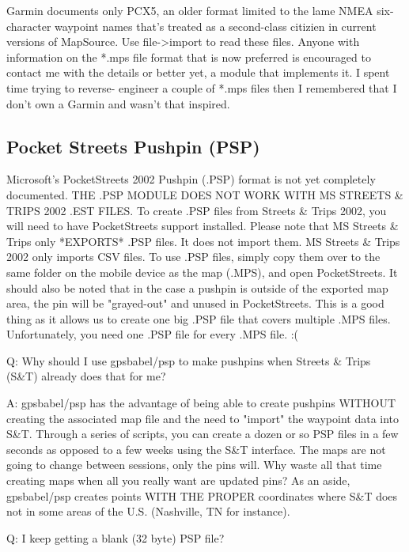 \documentclass[12pt]{article}
\begin{document}
	Garmin documents only PCX5, an older format limited to the lame NMEA
	six-character waypoint names that's treated as a second-class citizien
	in current versions of MapSource.  Use file->import to read these 
	files.   Anyone with information on the *.mps file format that is
	now preferred is encouraged to contact me with the details or better
	yet, a module that implements it.   I spent time trying to reverse-
	engineer a couple of *.mps files then I remembered that I don't own
	a Garmin and wasn't that inspired.



\subsection{Pocket Streets Pushpin (PSP)}

	Microsoft's PocketStreets 2002 Pushpin (.PSP) format is not yet 
	completely documented.  THE .PSP MODULE DOES NOT WORK WITH MS 
	STREETS \& TRIPS 2002 .EST FILES.  To create .PSP files from 
        Streets \& Trips 2002, you will need to have PocketStreets support 
	installed.  Please note that MS Streets \& Trips only *EXPORTS* 
	.PSP files. It does not import them.  MS Streets \& Trips 2002 
	only imports CSV files.  To use .PSP files, simply copy them 
	over to the same folder on the mobile device as the map (.MPS), 
	and open PocketStreets.  It should also be noted that in the case 
	a pushpin is outside of the exported map area, the pin will be 
	"grayed-out" and unused in PocketStreets.  This is a good thing 
	as it allows us to create one big .PSP file that covers multiple 
	.MPS files.  Unfortunately, you need one .PSP file for every 
	.MPS file. :(

Q: Why should I use gpsbabel/psp to make pushpins when Streets \& Trips (S\&T)
   already does that for me?

A: gpsbabel/psp has the advantage of being able to create pushpins WITHOUT
   creating the associated map file and the need to "import" the waypoint
   data into S\&T.  Through a series of scripts, you can create a dozen
   or so PSP files in a few seconds as opposed to a few weeks using the
   S\&T interface.  The maps are not going to change between sessions, 
   only the pins will.  Why waste all that time creating maps when all you
   really want are updated pins? As an aside, gpsbabel/psp creates points 
   WITH THE PROPER coordinates where S\&T does not in some areas of the U.S. 
   (Nashville, TN for instance).


Q: I keep getting a blank (32 byte) PSP file?
\end{document}
